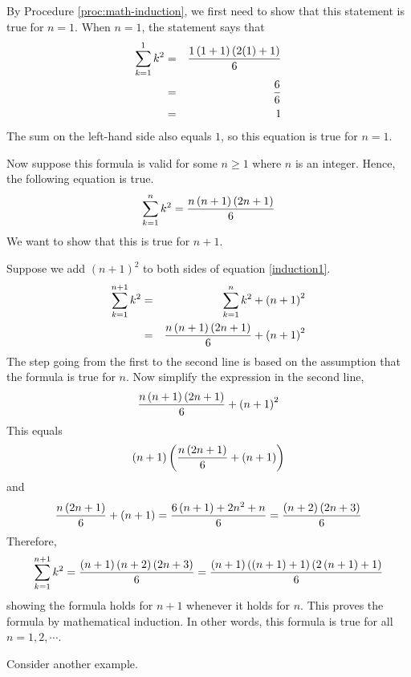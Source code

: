 \begin{solution}
By Procedure \ref{proc:math-induction}, we first need to show that this statement is true for $n=1$.
When $n=1$, the statement says that 
\begin{eqnarray*}
\sum_{k=1}^{1}k^{2}&=&\frac{1\left(1+1\right) \left(2(1)+1\right) }{6}\\
&=&\frac{6}{6} \\
&=& 1
\end{eqnarray*}
The sum on the left-hand side also equals $1$, so this equation is true for $n=1$.

Now suppose this formula is valid for some $n\geq
1$ where $n$ is an integer. Hence, the following equation is true.
\begin{equation}
\sum_{k=1}^{n}k^{2}=
\frac{n\left(n+1\right) \left(2n+1\right) }{6}
\label{induction1}
\end{equation}
We want to show that this is true for $n+1$. 

Suppose we add $(n+1)^2$ to both sides of equation \ref{induction1}.
\begin{eqnarray*}
\sum_{k=1}^{n+1}k^{2}&=&\sum_{k=1}^{n}k^{2}+\left(n+1\right) ^{2} \\
&=&\frac{n\left(n+1\right) \left(2n+1\right) }{6}+\left(n+1\right) ^{2}
\end{eqnarray*}
The step going from the first to the second line is based on the assumption
that the formula is true for $n$.
Now simplify the expression in the second line,
\begin{equation*}
\frac{n\left(n+1\right) \left(2n+1\right) }{6}+\left(n+1\right) ^{2}
\end{equation*}
This equals
\begin{equation*}
\left(n+1\right) \left(\frac{n\left(2n+1\right) }{6}+\left(n+1\right)
\right)
\end{equation*}
and
\begin{equation*}
\frac{n\left(2n+1\right) }{6}+\left(n+1\right) =\frac{6\left(n+1\right)
+2n^{2}+n}{6}=\frac{\allowbreak \left(n+2\right) \left(2n+3\right) }{6}
\end{equation*}
Therefore,
\begin{equation*}
\sum_{k=1}^{n+1}k^{2}=\frac{\allowbreak \left(n+1\right) \left(n+2\right)
\left(2n+3\right) }{6}=\frac{\allowbreak \left(n+1\right) \left(\left(
n+1\right) +1\right) \left(2\left(n+1\right) +1\right) }{6}
\end{equation*}
showing the formula holds for $n+1$ whenever it holds for $n$. This proves
the formula by mathematical induction. In other words, this formula is true for all $n = 1, 2, \cdots$.
\end{solution}

Consider another example.

